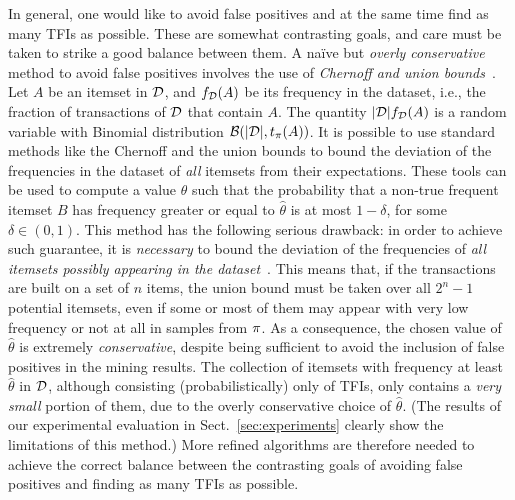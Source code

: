 In general, one would like to avoid false positives and at the same time find as
many TFIs as possible. These are somewhat contrasting goals, and care must be
taken to strike a good balance between them.  A na\"ive but \emph{overly
conservative} method to avoid false positives involves the use of \emph{Chernoff
and union bounds}~\citep{MitzenmacherU05}.  Let $A$ be an itemset in ${\cal D}$, and
$f_{\cal D}(A)$ be its frequency in the dataset, i.e., the fraction of transactions
of ${\cal D}$ that contain $A$. The quantity $|{\cal D}|f_{\cal D}(A)$ is a random variable
with Binomial distribution $\mathcal{B}(|{\cal D}|,t_\pi(A))$. It is possible to use
standard methods like the Chernoff and the union bounds to bound the deviation
of the frequencies in the dataset of \emph{all} itemsets from their
expectations. These tools can be used to compute a value $\hat\theta$ such that
the probability that a non-true frequent itemset $B$ has frequency greater or
equal to $\hat\theta$ is at most $1-\delta$, for some $\delta\in(0,1)$. This
method has the following serious drawback: in order to achieve such guarantee,
it is \emph{necessary} to bound the deviation of the frequencies of \emph{all
itemsets possibly appearing in the dataset}~\citep{KirschMAPUV12}. This means
that, if the transactions are built on a set of $n$ items, the union bound must
be taken over all $2^n-1$ potential itemsets, even if some or most of them may
appear with very low frequency or not at all in samples from $\pi$. As a
consequence, the chosen value of $\hat\theta$ is extremely \emph{conservative},
despite being sufficient to avoid the inclusion of false positives in the mining
results. The collection of itemsets with frequency at least $\hat\theta$ in
${\cal D}$, although consisting (probabilistically) only of TFIs, only contains a
\emph{very small} portion of them, due to the overly conservative choice of
$\hat\theta$. (The results of our experimental evaluation in
Sect.~\ref{sec:experiments} clearly show the limitations of this method.) More
refined algorithms are therefore needed to achieve the correct balance between
the contrasting goals of avoiding false positives and finding as many TFIs as
possible.


